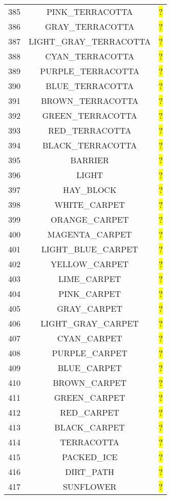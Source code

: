 \documentclass[11pt]{article}
\newcommand\myworries[1]{\sethlcolor{red}\hl{#1}}
\begin{document}
\begin{longtable}{ |c|c|c| }
	385 & PINK\_TERRACOTTA & \myworries{?} \\
	386 & GRAY\_TERRACOTTA & \myworries{?} \\
	387 & LIGHT\_GRAY\_TERRACOTTA & \myworries{?} \\
	388 & CYAN\_TERRACOTTA & \myworries{?} \\
	389 & PURPLE\_TERRACOTTA & \myworries{?} \\
	390 & BLUE\_TERRACOTTA & \myworries{?} \\
	391 & BROWN\_TERRACOTTA & \myworries{?} \\
	392 & GREEN\_TERRACOTTA & \myworries{?} \\
	393 & RED\_TERRACOTTA & \myworries{?} \\
	394 & BLACK\_TERRACOTTA & \myworries{?} \\
	395 & BARRIER & \myworries{?} \\
	396 & LIGHT & \myworries{?} \\
	397 & HAY\_BLOCK & \myworries{?} \\
	398 & WHITE\_CARPET & \myworries{?} \\
	399 & ORANGE\_CARPET & \myworries{?} \\
	400 & MAGENTA\_CARPET & \myworries{?} \\
	401 & LIGHT\_BLUE\_CARPET & \myworries{?} \\
	402 & YELLOW\_CARPET & \myworries{?} \\
	403 & LIME\_CARPET & \myworries{?} \\
	404 & PINK\_CARPET & \myworries{?} \\
	405 & GRAY\_CARPET & \myworries{?} \\
	406 & LIGHT\_GRAY\_CARPET & \myworries{?} \\
	407 & CYAN\_CARPET & \myworries{?} \\
	408 & PURPLE\_CARPET & \myworries{?} \\
	409 & BLUE\_CARPET & \myworries{?} \\
	410 & BROWN\_CARPET & \myworries{?} \\
	411 & GREEN\_CARPET & \myworries{?} \\
	412 & RED\_CARPET & \myworries{?} \\
	413 & BLACK\_CARPET & \myworries{?} \\
	414 & TERRACOTTA & \myworries{?} \\
	415 & PACKED\_ICE & \myworries{?} \\
	416 & DIRT\_PATH & \myworries{?} \\
	417 & SUNFLOWER & \myworries{?} \\

\end{longtable}
\end{document}
